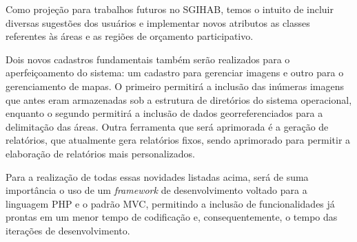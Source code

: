 \documentclass[10pt, twocolumn]{article}
\begin{document}
Como projeção para trabalhos futuros no SGIHAB, temos o intuito de incluir diversas sugestões dos usuários e implementar novos atributos as classes referentes às áreas e as regiões de orçamento participativo. 

Dois novos cadastros fundamentais também serão realizados para o aperfeiçoamento do sistema: um cadastro para gerenciar imagens e outro para o gerenciamento de mapas. O primeiro permitirá a inclusão das inúmeras imagens que antes eram armazenadas sob a estrutura de diretórios do sistema operacional, enquanto o segundo permitirá a inclusão de dados georreferenciados para a delimitação das áreas. Outra ferramenta que será aprimorada é a geração de relatórios, que atualmente gera relatórios fixos, sendo aprimorado para permitir a elaboração de relatórios mais personalizados.

Para a realização de todas essas novidades listadas acima, será de suma importância o uso de um \textit{framework} de desenvolvimento voltado para a linguagem PHP e o padrão MVC, permitindo a inclusão de funcionalidades já prontas em um menor tempo de codificação e, consequentemente, o tempo das iterações de desenvolvimento.
\end{document}
